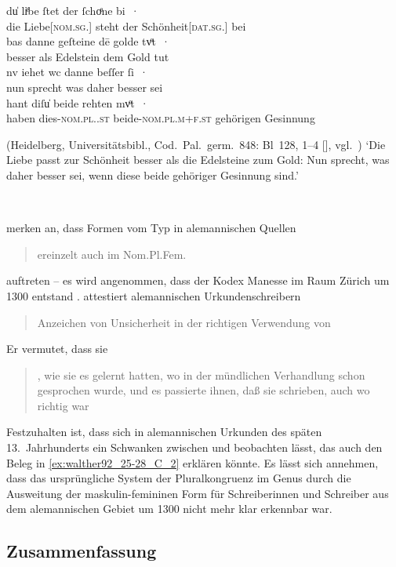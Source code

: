 \begin{exe}
\ex\label{ex:walther92_25-28_C_2}
	\gll du̍ liͤbe ſtet der ſchoͤne bi~· \\
		die Liebe[\textsc{nom.sg.\FemI}] steht der Schönheit[\textsc{dat.sg.\FemI}] bei \\
\sn \gll bas danne geſteine dē golde tvͦt~· \\
		besser als Edelstein dem Gold tut \\
\sn \gll nv iehet wc danne beſſer ſi~· \\
		nun sprecht was daher besser sei \\
\sn \gll hant diſu̍ beide rehten mvͦt~· \\
		haben dies-\textsc{nom.pl.\NeutI.st} beide-\textsc{nom.pl.m+f\subI.st} gehörigen Gesinnung \\
	\begin{taggedline}{(Heidelberg, Universitätsbibl., Cod.~Pal.~germ.~848: Bl~128\rb, 1--4 [\cite[4957]{hsc}], vgl.~\cite[356--358]{bein2013})}
	\trans `Die Liebe passt zur Schönheit besser als die Edelsteine zum
	Gold: Nun sprecht, was daher besser sei, wenn diese beide gehöriger
	Gesinnung sind.' %
	\end{taggedline}
	\\
\end{exe}

\citeauthor{ksw2} merken an, dass Formen vom Typ  in alemannischen
Quellen \blockcquote[485]{ksw2}{ereinzelt auch im Nom.Pl.Fem.}
auftreten -- es wird angenommen, dass der Kodex Manesse im Raum Zürich um 1300
entstand \autocite[4957]{hsc}.  attestiert alemannischen
Urkundenschreibern \blockcquote[27]{deboor1976b}{Anzeichen von Unsicherheit in
der richtigen Verwendung von }. Er vermutet, dass sie
\blockcquote[28]{deboor1976b}{ , wie sie es
gelernt hatten, wo in der mündlichen Verhandlung schon  gesprochen
wurde, und es passierte ihnen, daß sie  schrieben, auch wo
 richtig war}. Festzuhalten ist, dass sich in alemannischen Urkunden
des späten 13.~Jahrhunderts ein Schwanken zwischen  und 
beobachten lässt, das auch den Beleg in \cref{ex:walther92_25-28_C_2} erklären
könnte. Es lässt sich annehmen, dass das ursprüngliche System der
Pluralkongruenz im Genus durch die Ausweitung der maskulin-femininen Form für
Schreiberinnen und Schreiber aus dem alemannischen Gebiet um 1300 nicht mehr
klar erkennbar war.

\subsection{Zusammenfassung}


